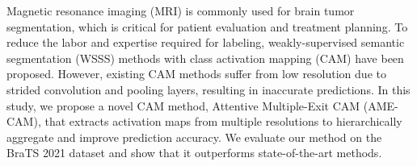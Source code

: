 

Magnetic resonance imaging (MRI) is commonly used for brain tumor segmentation, which is critical for patient evaluation and treatment planning. To reduce the labor and expertise required for labeling, weakly-supervised semantic segmentation (WSSS) methods with class activation mapping (CAM) have been proposed. However, existing CAM methods suffer from low resolution due to strided convolution and pooling layers, resulting in inaccurate predictions. In this study, we propose a novel CAM method, Attentive Multiple-Exit CAM (AME-CAM), that extracts activation maps from multiple resolutions to hierarchically aggregate and improve prediction accuracy. We evaluate our method on the BraTS 2021 dataset and show that it outperforms state-of-the-art methods.